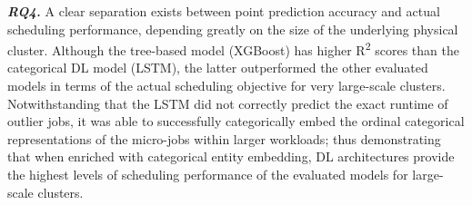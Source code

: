 \textbf{\textit{RQ4.}} A clear separation exists between point prediction accuracy and actual scheduling performance, depending greatly on the size of the underlying physical cluster. Although the tree-based model (XGBoost) has higher R\textsuperscript{2} scores than the categorical DL model (LSTM), the latter outperformed the other evaluated models in terms of the actual scheduling objective for very large-scale clusters. Notwithstanding that the LSTM did not correctly predict the exact runtime of outlier jobs, it was able to successfully categorically embed the ordinal categorical representations of the micro-jobs within larger workloads; thus demonstrating that when enriched with categorical entity embedding, DL architectures provide the highest levels of scheduling performance of the evaluated models for large-scale clusters.